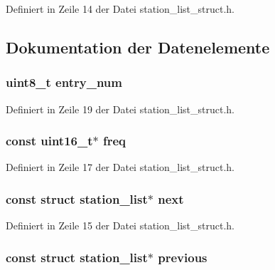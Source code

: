 Definiert in Zeile 14 der Datei station\+\_\+list\+\_\+struct.\+h.



\subsection{Dokumentation der Datenelemente}
\hypertarget{structstation__list_aab8c201217e885e0ee4e61820a289c0c}{}
\subsubsection[{entry\+\_\+num}]{\setlength{\rightskip}{0pt plus 5cm}uint8\+\_\+t entry\+\_\+num}\label{structstation__list_aab8c201217e885e0ee4e61820a289c0c}


Definiert in Zeile 19 der Datei station\+\_\+list\+\_\+struct.\+h.

\hypertarget{structstation__list_a0c8c7380b4e3197fe0b821b4a6dfbec9}{}
\subsubsection[{freq}]{\setlength{\rightskip}{0pt plus 5cm}const uint16\+\_\+t$\ast$ freq}\label{structstation__list_a0c8c7380b4e3197fe0b821b4a6dfbec9}


Definiert in Zeile 17 der Datei station\+\_\+list\+\_\+struct.\+h.

\hypertarget{structstation__list_aaf7e88858b6e1e91f04c50ce118be602}{}
\subsubsection[{next}]{\setlength{\rightskip}{0pt plus 5cm}const struct {\bf station\+\_\+list}$\ast$ next}\label{structstation__list_aaf7e88858b6e1e91f04c50ce118be602}


Definiert in Zeile 15 der Datei station\+\_\+list\+\_\+struct.\+h.

\hypertarget{structstation__list_ae039c5ce88254ad89cea9170a5f3b740}{}
\subsubsection[{previous}]{\setlength{\rightskip}{0pt plus 5cm}const struct {\bf station\+\_\+list}$\ast$ previous}\label{structstation__list_ae039c5ce88254ad89cea9170a5f3b740}


